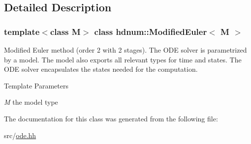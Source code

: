 \subsection{Detailed Description}
\subsubsection*{template$<$class M$>$ class hdnum::ModifiedEuler$<$ M $>$}

Modified Euler method (order 2 with 2 stages). The ODE solver is parametrized by a model. The model also exports all relevant types for time and states. The ODE solver encapsulates the states needed for the computation.


\begin{DoxyTemplParams}{Template Parameters}
\item[{\em M}]the model type \end{DoxyTemplParams}


The documentation for this class was generated from the following file:\begin{DoxyCompactItemize}
\item 
src/\hyperlink{ode_8hh}{ode.hh}\end{DoxyCompactItemize}
